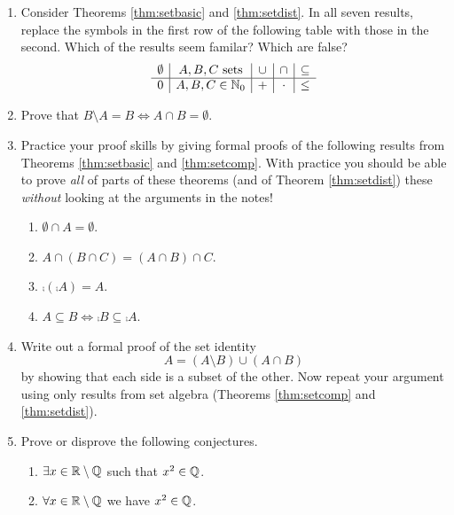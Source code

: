 \begin{exercises}{}{}
\begin{enumerate}
	\item Consider Theorems \ref{thm:setbasic} and \ref{thm:setdist}. In all seven results, replace the symbols in the first row of the following table with those in the second. Which of the results seem familar? Which are false?
\[\begin{array}{c|c|c|c|c}
\emptyset&A,B,C\text{ sets}&\cup&\cap&\subseteq\\\hline
0&A,B,C\in\mathbb{N}_0&+&\cdot&\le
\end{array}\]

	\item Prove that $B\setminus A=B\iff A\cap B=\emptyset$.
	
	\item Practice your proof skills by giving formal proofs of the following results from Theorems \ref{thm:setbasic} and \ref{thm:setcomp}. With practice you should be able to prove \emph{all} of parts of these theorems (and of Theorem \ref{thm:setdist}) these \emph{without} looking at the arguments in the notes!
	\begin{enumerate}
	  \item $\emptyset\cap A=\emptyset$.
		\item $A\cap (B\cap C)=(A\cap B)\cap C$.
		\item $\comp{(\comp A)}=A$.
		\item $A\subseteq B\iff \comp B\subseteq \comp A$.
	\end{enumerate}

	\item Write out a formal proof of the set identity
	\[A=(A\setminus B)\cup (A\cap B)\]
	by showing that each side is a subset of the other. Now repeat your argument using only results from set algebra (Theorems \ref{thm:setcomp} and \ref{thm:setdist}).
	
	
	


		
  \item Prove or disprove the following conjectures.
  \begin{enumerate}
    \item $\exists x\in\mathbb{R}\setminus\mathbb{Q}$ such that $x^2\in\mathbb{Q}$.
    \item $\forall x\in\mathbb{R}\setminus\mathbb{Q}$ we have $x^2\in\mathbb{Q}$.
	\end{enumerate}
\end{enumerate}

\end{exercises}
\clearpage

\iffalse

